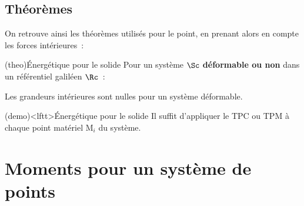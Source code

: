 \documentclass[../../main/main.tex]{subfiles}
\begin{document}
\subsection{Théorèmes}
On retrouve ainsi les théorèmes utilisés pour le point, en prenant alors en
compte les forces intérieures~:
\begin{tcb*}(theo){Énergétique pour le solide}
	Pour un système $\Sc$ \textbf{déformable ou non} dans un référentiel galiléen
	$\Rc$~:
	\smallbreak
	\begin{isd}
		\begin{center}
		\end{center}
		\vspace{-15pt}
		\tcblower
		\begin{center}
		\end{center}
		\vspace{-15pt}
	\end{isd}
	Les grandeurs intérieures sont nulles pour un système déformable.
\end{tcb*}

\begin{tcb*}(demo)<lftt>{Énergétique pour le solide}
	Il suffit d'appliquer le TPC ou TPM à chaque point matériel M$_i$ du
	système.
\end{tcb*}

\section{Moments pour un système de points}
\end{document}
